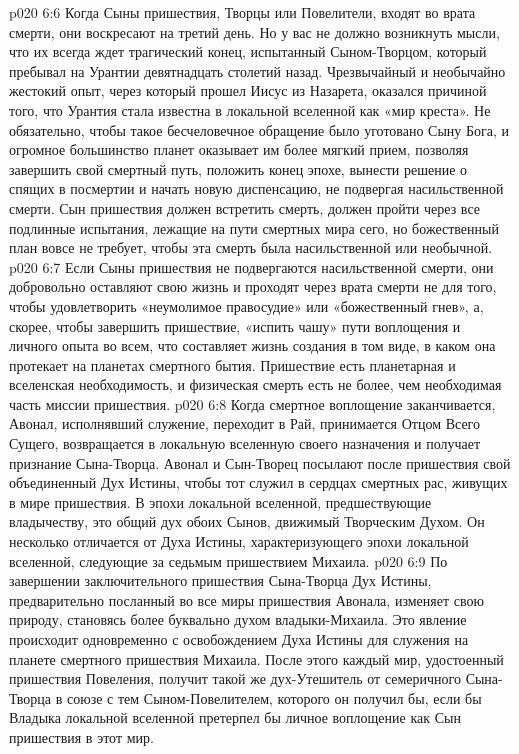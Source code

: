 \vs p020 6:6 \pc Когда Сыны пришествия, Творцы или Повелители, входят во врата смерти, они воскресают на третий день. Но у вас не должно возникнуть мысли, что их всегда ждет трагический конец, испытанный Сыном\hyp{}Творцом, который пребывал на Урантии девятнадцать столетий назад. Чрезвычайный и необычайно жестокий опыт, через который прошел Иисус из Назарета, оказался причиной того, что Урантия стала известна в локальной вселенной как «мир креста». Не обязательно, чтобы такое бесчеловечное обращение было уготовано Сыну Бога, и огромное большинство планет оказывает им более мягкий прием, позволяя завершить свой смертный путь, положить конец эпохе, вынести решение о спящих в посмертии и начать новую диспенсацию, не подвергая насильственной смерти. Сын пришествия должен встретить смерть, должен пройти через все подлинные испытания, лежащие на пути смертных мира сего, но божественный план вовсе не требует, чтобы эта смерть была насильственной или необычной.
\vs p020 6:7 Если Сыны пришествия не подвергаются насильственной смерти, они добровольно оставляют свою жизнь и проходят через врата смерти не для того, чтобы удовлетворить «неумолимое правосудие» или «божественный гнев», а, скорее, чтобы завершить пришествие, «испить чашу» пути воплощения и личного опыта во всем, что составляет жизнь создания в том виде, в каком она протекает на планетах смертного бытия. Пришествие есть планетарная и вселенская необходимость, и физическая смерть есть не более, чем необходимая часть миссии пришествия.
\vs p020 6:8 Когда смертное воплощение заканчивается, Авонал, исполнявший служение, переходит в Рай, принимается Отцом Всего Сущего, возвращается в локальную вселенную своего назначения и получает признание Сына\hyp{}Творца. Авонал и Сын\hyp{}Творец посылают после пришествия свой объединенный Дух Истины, чтобы тот служил в сердцах смертных рас, живущих в мире пришествия. В эпохи локальной вселенной, предшествующие владычеству, это общий дух обоих Сынов, движимый Творческим Духом. Он несколько отличается от Духа Истины, характеризующего эпохи локальной вселенной, следующие за седьмым пришествием Михаила.
\vs p020 6:9 По завершении заключительного пришествия Сына\hyp{}Творца Дух Истины, предварительно посланный во все миры пришествия Авонала, изменяет свою природу, становясь более буквально духом владыки\hyp{}Михаила. Это явление происходит одновременно с освобождением Духа Истины для служения на планете смертного пришествия Михаила. После этого каждый мир, удостоенный пришествия Повеления, получит такой же дух\hyp{}Утешитель от семеричного Сына\hyp{}Творца в союзе с тем Сыном\hyp{}Повелителем, которого он получил бы, если бы Владыка локальной вселенной претерпел бы личное воплощение как Сын пришествия в этот мир.
